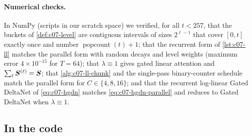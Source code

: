 \paragraph{Numerical checks.} In NumPy (scripts in our scratch space) we verified, for all
$t < 257$, that the buckets of \cref{def:c07-level} are contiguous intervals of sizes
$2^{\ell-1}$ that cover $[0,t]$ exactly once and number $\operatorname{popcount}(t)+1$; that
the recurrent form of \cref{lst:c07-ll} matches the parallel form with random decays and
level weights (maximum error $4\times 10^{-15}$ for $T = 64$); that $\lambda\equiv 1$ gives
gated linear attention and $\sum_\ell \bm{S}^{(\ell)} = \bm{S}$; that \cref{alg:c07-ll-chunk} and the
single-pass binary-counter schedule match the parallel form for $C \in\{4, 8, 16\}$; and that the
recurrent log-linear Gated DeltaNet of \cref{eq:c07-hgdn} matches
\cref{eq:c07-hgdn-parallel} and reduces to Gated DeltaNet when $\lambda\equiv 1$.

\subsection{In the code}\label{sec:c07-ll-code}

